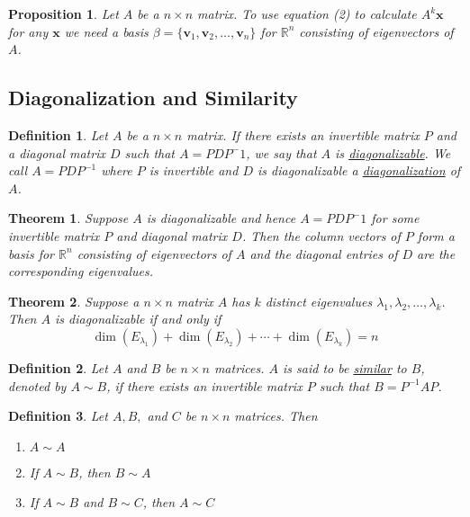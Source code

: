 \documentclass{article}
\theoremstyle{definitionstyle}
\newtheorem{definition}{Definition}[section]
\newtheorem{theorem}{Theorem}[section]
\newtheorem{proposition}{Proposition}[section]
\begin{document}
\begin{proposition}
    Let $A$ be a $n \times n$ matrix. To use equation (2) to calculate $A^k\mathbf{x}$ for any $\mathbf{x}$ we
    need a basis $\beta = \{\mathbf{v}_1,\mathbf{v}_2,\dots,\mathbf{v}_n\}$ for $\mathbb{R}^n$ consisting of eigenvectors of $A$.
\end{proposition}

\subsection{Diagonalization and Similarity}
\begin{definition}
    Let $A$ be a $n \times n$ matrix. If there exists an invertible matrix $P$ and a diagonal matrix $D$ such that
    $A=PDP^-1$, we say that $A$ is \underline{diagonalizable}.
    We call $A=PDP^{-1}$ where $P$ is invertible and $D$ is diagonalizable a \underline{diagonalization} of $A$.
\end{definition}

\begin{theorem}
    Suppose $A$ is diagonalizable and hence $A=PDP^-1$ for some invertible matrix $P$ and diagonal matrix $D$.
    Then the column vectors of $P$ form a basis for $\mathbb{R}^n$ consisting of \textit{eigenvectors} of $A$ and the diagonal entries of
    $D$ are the corresponding \textit{eigenvalues}.
\end{theorem}

\begin{theorem}
    Suppose a $n \times n$ matrix $A$ has $k$ distinct eigenvalues $\lambda_1,\lambda_2,\dots,\lambda_k$.
    Then $A$ is diagonalizable if and only if
    \begin{equation*}
        \dim(E_{\lambda_1})+\dim(E_{\lambda_2})+\cdots+\dim(E_{\lambda_k})=n
    \end{equation*}
\end{theorem}

\begin{definition}
    Let $A$ and $B$ be $n \times n$ matrices. $A$ is said to be \underline{similar} to $B$, denoted by $A \sim B$, if
    there exists an invertible matrix $P$ such that $B=P^{-1}AP$.
\end{definition}

\begin{definition}
    Let $A,B,$ and $C$ be $n \times n$ matrices. Then
    \begin{enumerate}
        \item $A \sim A$
        \item If $A \sim B$, then $B \sim A$
        \item If $A \sim B$ and $B \sim C$, then $A \sim C$
    \end{enumerate}
\end{definition}
\end{document}
